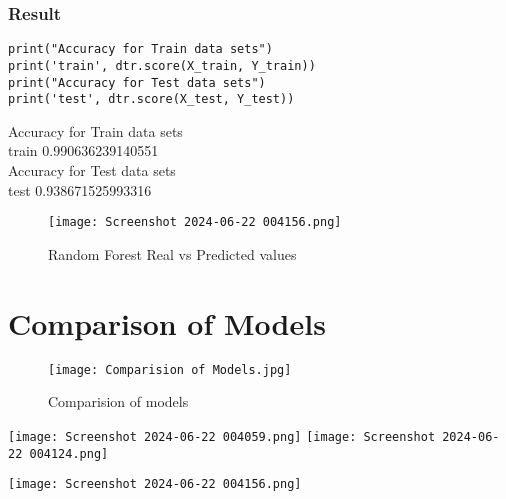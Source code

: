 \documentclass[12pt,a4paper]{report}
\begin{document}
\subsection{Result}
\begin{lstlisting}
print("Accuracy for Train data sets")
print('train', dtr.score(X_train, Y_train))
print("Accuracy for Test data sets")
print('test', dtr.score(X_test, Y_test))
\end{lstlisting}
Accuracy for Train data sets\\
train 0.990636239140551\\
Accuracy for Test data sets\\
test 0.938671525993316
\begin{figure} [!ht]
    \centering
    \texttt{[image: Screenshot 2024-06-22 004156.png]}
    \caption{Random Forest Real vs Predicted values}
    \label{fig:enter-label}
\end{figure}
\chapter{Comparison of Models}
\begin{figure} [!ht]
    \centering
    \texttt{[image: Comparision of Models.jpg]}
    \caption{Comparision of models}
    \label{fig:enter-label}
\end{figure}
\texttt{[image: Screenshot 2024-06-22 004059.png]}
\texttt{[image: Screenshot 2024-06-22 004124.png]}
\begin{center}
    \texttt{[image: Screenshot 2024-06-22 004156.png]}
\end{center}
\end{document}
